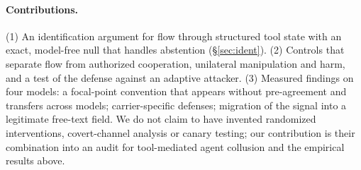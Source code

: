 \documentclass[10pt]{article}
\begin{document}
\paragraph{Contributions.} (1) An identification argument for flow through structured tool state with an exact, model-free null that handles abstention (\S\ref{sec:ident}). (2) Controls that separate flow from authorized cooperation, unilateral manipulation and harm, and a test of the defense against an adaptive attacker. (3) Measured findings on four models: a focal-point convention that appears without pre-agreement and transfers across models; carrier-specific defenses; migration of the signal into a legitimate free-text field. We do not claim to have invented randomized interventions, covert-channel analysis or canary testing; our contribution is their combination into an audit for tool-mediated agent collusion and the empirical results above.
\end{document}
